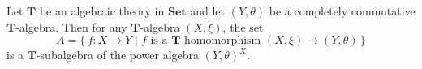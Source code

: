 Let $\mathbf{T}$ be an algebraic theory in $\mathbf{Set}$ and let $(Y, \theta)$ be a completely commutative $\mathbf{T}$-algebra. Then for any $\mathbf{T}$-algebra $(X, \xi)$, the set
$$A = \{\, f \colon X \longrightarrow Y \mid f \text{ is a } \mathbf{T}\text{-homomorphism } (X, \xi) \longrightarrow (Y, \theta) \,\}$$
is a $\mathbf{T}$-subalgebra of the power algebra $(Y, \theta)^X$.
